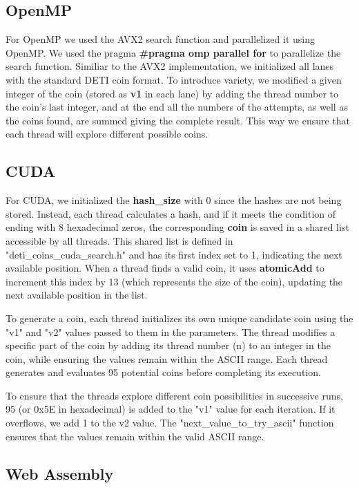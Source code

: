 \documentclass[a4paper,12pt]{article}
\begin{document}
\subsection{OpenMP}
\label{subsec:openmp}

For OpenMP we used the AVX2 search function and parallelized it using OpenMP.
We used the pragma \textbf{\#pragma omp parallel for} to parallelize the 
search function.
Similiar to the AVX2 implementation, we initialized all lanes with the standard
DETI coin format. To introduce variety, we modified a given integer of the coin
(stored as \textbf{v1} in each lane) by adding the thread number to the coin's last integer,
 and at the end all the numbers of the attempts, as well as the coins found, are summed giving the complete result.
This way we ensure that each thread will explore different possible coins.

\subsection{CUDA}
\label{subsec:cuda}

For CUDA, we initialized the \textbf{hash\_size} with 0 since the hashes are not being stored. Instead, each thread calculates a hash, and if it meets the condition of ending with 8 hexadecimal zeros, the corresponding \textbf{coin} is saved in a shared list accessible by all threads. This shared list is defined in "deti\_coins\_cuda\_search.h" and has its first index set to 1, indicating the next available position. When a thread finds a valid coin, it uses \textbf{atomicAdd} to increment this index by 13 (which represents the size of the coin), updating the next available position in the list.

To generate a coin, each thread initializes its own unique candidate coin using the "v1" and "v2" values passed to them in the parameters. The thread modifies a specific part of the coin by adding its thread number (n) to an integer in the coin, while ensuring the values remain within the ASCII range. Each thread generates and evaluates 95 potential coins before completing its execution.

To ensure that the threads explore different coin possibilities in successive runs, 95 (or 0x5E in hexadecimal) is added to the "v1" value for each iteration. If it overflows, we add 1 to the v2 value. The "next\_value\_to\_try\_ascii" function ensures that the values remain within the valid ASCII range.

\subsection{Web Assembly}
\label{subsec:wasm}
\end{document}
